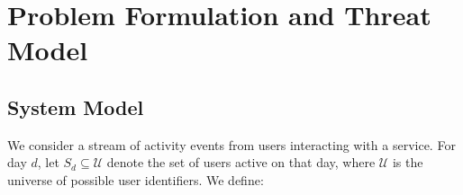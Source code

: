 \documentclass[sigconf,anonymous,review]{acmart}
\begin{document}
\begin{table}[H]
    \centering
    \caption{Comparison with real-world privacy systems}
    \label{tab:related-work}
\end{table}

\section{Problem Formulation and Threat Model}
\label{sec:problem}

\subsection{System Model}

We consider a stream of activity events from users interacting with a service. For day $d$, let $S_d \subseteq \mathcal{U}$ denote the set of users active on that day, where $\mathcal{U}$ is the universe of possible user identifiers. We define:
\end{document}
